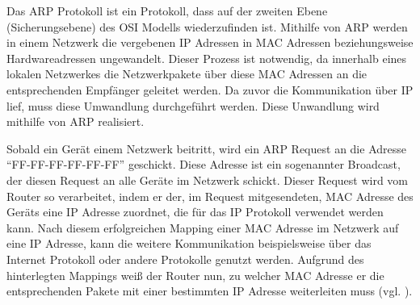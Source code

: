 Das \ac{ARP} Protokoll ist ein Protokoll, dass auf der zweiten Ebene (Sicherungsebene) des OSI Modells wiederzufinden ist. Mithilfe von \ac{ARP} werden in einem Netzwerk die vergebenen \ac{IP} Adressen in \ac{MAC} Adressen beziehungsweise Hardwareadressen ungewandelt. Dieser Prozess ist notwendig, da innerhalb eines lokalen Netzwerkes die Netzwerkpakete über diese \ac{MAC} Adressen an die entsprechenden Empfänger geleitet werden. Da zuvor die Kommunikation über \ac{IP} lief, muss diese Umwandlung durchgeführt werden. 
Diese Unwandlung wird mithilfe von \ac{ARP} realisiert. 

Sobald ein Gerät einem Netzwerk beitritt, wird ein \ac{ARP} Request an die Adresse ``FF-FF-FF-FF-FF-FF'' geschickt. Diese Adresse ist ein sogenannter Broadcast, der diesen Request an alle Geräte im Netzwerk schickt. Dieser Request wird vom Router so verarbeitet, indem er der, im Request mitgesendeten, MAC Adresse des Geräts eine \ac{IP} Adresse zuordnet, die für das IP Protokoll verwendet werden kann. Nach diesem erfolgreichen Mapping einer \ac{MAC} Adresse im Netzwerk auf eine \ac{IP} Adresse, kann die weitere Kommunikation beispielsweise über das Internet Protokoll oder andere Protokolle genutzt werden. Aufgrund des hinterlegten Mappings weiß der Router nun, zu welcher \ac{MAC} Adresse er die entsprechenden Pakete mit einer bestimmten \ac{IP} Adresse weiterleiten muss (vgl. \cite{.r}\cite{.s}).